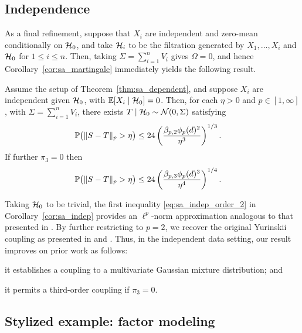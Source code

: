 \subsection{Independence}

As a final refinement, suppose that $X_i$ are independent and
zero-mean conditionally on $\cH_0$,
and take $\cH_i$ to be the filtration
generated by $X_1, \ldots, X_i$ and $\cH_0$ for $1 \leq i \leq n$.
Then, taking $\Sigma = \sum_{i=1}^n V_i$
gives $\Omega = 0$, and hence Corollary~\ref{cor:sa_martingale}
immediately yields the following result.
%
\begin{corollary}%
  \label{cor:sa_indep}

  Assume the setup of Theorem~\ref{thm:sa_dependent},
  and suppose $X_i$ are independent given $\cH_0$,
  with $\E[X_i \mid \cH_0] = 0$.
  Then, for each $\eta > 0$ and $p \in [1,\infty]$,
  with $\Sigma = \sum_{i=1}^n V_i$,
  there exists $T \mid \cH_0 \sim \cN(0, \Sigma)$ satisfying
  \begin{align}
    \label{eq:sa_indep_order_2}
    \P\big(\|S-T\|_p > \eta\big)
    &\leq
    24 \left(
      \frac{\beta_{p,2} \phi_p(d)^2}{\eta^3}
    \right)^{1/3}.
  \end{align}
  If further $\pi_3 = 0$ then
  \begin{align*}
    \P\big(\|S-T\|_p > \eta\big)
    &\leq
    24 \left(
      \frac{\beta_{p,3} \phi_p(d)^3}{\eta^4}
    \right)^{1/4}.
  \end{align*}
\end{corollary}

Taking $\cH_0$ to be trivial, the first inequality \eqref{eq:sa_indep_order_2}
in Corollary~\ref{cor:sa_indep} provides an $\ell^p$-norm approximation
analogous to that presented in \citet{belloni2019conditional}.
By further
restricting to $p=2$, we recover the original Yurinskii coupling as presented
in \citet[Theorem~1]{lecam1988} and \citet[Theorem~10]{pollard2002user}. Thus,
in the independent data setting, our result improves on prior work as follows:
\begin{inlineroman}
\item
  it establishes a coupling to a multivariate Gaussian mixture distribution;
  and
\item
  it permits a third-order coupling if $\pi_3=0$.
\end{inlineroman}

\subsection{Stylized example: factor modeling}
\label{sec:factor}

